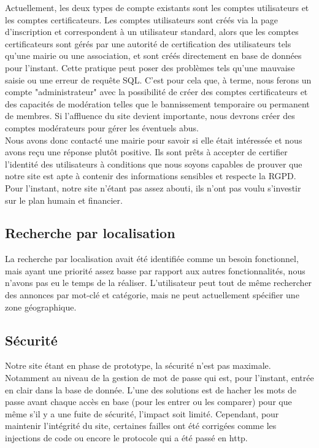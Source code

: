 \documentclass[a4paper,11pt]{article}
\begin{document}
Actuellement, les deux types de compte existants sont les comptes utilisateurs et les comptes certificateurs. Les comptes utilisateurs sont créés via la page d'inscription et correspondent à un utilisateur standard, alors que les comptes certificateurs sont gérés par une autorité de certification des utilisateurs tels qu'une mairie ou une association, et sont créés directement en base de données pour l'instant. Cette pratique peut poser des problèmes tels qu'une mauvaise saisie ou une erreur de requête SQL. C'est pour cela que, à terme, nous ferons un compte "administrateur" avec la possibilité de créer des comptes certificateurs et des capacités de modération telles que le bannissement temporaire ou permanent de membres.
Si l'affluence du site devient importante, nous devrons créer des comptes modérateurs pour gérer les éventuels abus.\\

Nous avons donc contacté une mairie pour savoir si elle était intéressée et nous avons reçu une réponse plutôt positive. Ils sont prêts à accepter de certifier l'identité des utilisateurs à conditions que nous soyons capables de prouver que notre site est apte à contenir des informations sensibles et respecte la RGPD. Pour l'instant, notre site n'étant pas assez abouti, ils n'ont pas voulu s'investir sur le plan humain et financier.

\subsection{Recherche par localisation}
La recherche par localisation avait été identifiée comme un besoin fonctionnel,
mais ayant une priorité assez basse par rapport aux autres fonctionnalités, nous n'avons
pas eu le temps de la réaliser. L'utilisateur peut tout de même rechercher des annonces par mot-clé
et catégorie, mais ne peut actuellement spécifier une zone géographique.

\subsection{Sécurité}
Notre site étant en phase de prototype, la sécurité n'est pas maximale. Notamment au niveau de la gestion de mot de passe qui est, pour l'instant, entrée en clair dans la base de donnée. L'une des solutions est de hacher les mots de passe avant chaque accès en base (pour les entrer ou les comparer) pour que même s'il y a une fuite de sécurité, l'impact soit limité. Cependant, pour maintenir l'intégrité du site, certaines failles ont été corrigées comme les injections de code ou encore le protocole qui a été passé en http.
\end{document}
